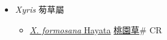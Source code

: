 
  \begin{itemize}
 \item[] \textit{Xyris} 茐草屬
                    
  \begin{itemize}
        \item[] \href{http://www.theplantlist.org/tpl1.1/search?q=Xyris+formosana}{\textit{X. formosana} Hayata}   \href{\detokenize{http://taibnet.sinica.edu.tw/chi/taibnet_species_list.php?T2=桃園草&T2_new_value=true&fr=y}}{桃園草}\# CR
  \end{itemize}
  \end{itemize}
